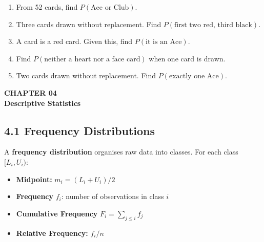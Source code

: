 \documentclass[12pt]{article}
\begin{document}
\begin{practicebox}
\begin{enumerate}[label=\textbf{Q\arabic*.},noitemsep]
  \item From 52 cards, find $P(\text{Ace or Club})$.
  \item Three cards drawn without replacement. Find $P(\text{first two red, third black})$.
  \item A card is a red card. Given this, find $P(\text{it is an Ace})$.
  \item Find $P(\text{neither a heart nor a face card})$ when one card is drawn.
  \item Two cards drawn without replacement. Find $P(\text{exactly one Ace})$.
\end{enumerate}
\end{practicebox}

\newpage

\begin{tcolorbox}[enhanced,arc=0pt,boxrule=0pt,colback=primary,colframe=primary,
  left=16pt,right=16pt,top=14pt,bottom=10pt,borderline south={4pt}{0pt}{accent}]
  {\color{accent!70}\small\bfseries CHAPTER 04}\\[4pt]
  {\LARGE\bfseries\color{white}Descriptive Statistics}
\end{tcolorbox}
\vspace{10pt}

\subsection{4.1 Frequency Distributions}

\begin{defbox}
A \textbf{frequency distribution} organises raw data into classes. For each class $[L_i, U_i)$:
\begin{itemize}[noitemsep]
  \item \textbf{Midpoint:} $m_i=(L_i+U_i)/2$
  \item \textbf{Frequency} $f_i$: number of observations in class $i$
  \item \textbf{Cumulative Frequency} $F_i=\sum_{j\leq i}f_j$
  \item \textbf{Relative Frequency:} $f_i/n$
\end{itemize}
\end{defbox}
\end{document}
